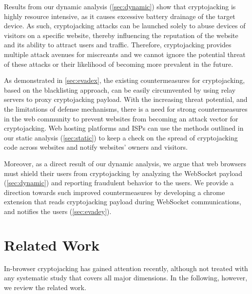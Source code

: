 \documentclass[acmlarge]{acmart}
\newcommand{\cc}{{cryptocurrency}\xspace}
\newcommand{\cj}{cryptojacking\xspace}
\begin{document}
Results from our dynamic analysis (\textsection\ref{sec:dynamic}) show that \cj is highly resource intensive, as it causes excessive battery drainage of the target device. As such, \cj attacks can be launched solely to abuse devices of visitors on a specific website, thereby influencing the reputation of the website and its ability to attract users and traffic. Therefore, \cj provides multiple attack avenues for miscreants and we cannot ignore the potential threat of these attacks or their likelihood of becoming more prevalent in the future. 

As demonstrated in \textsection\ref{sec:evadex}, the existing countermeasures for \cj, based on the blacklisting approach, can be easily circumvented by using relay servers to proxy \cj payload. With the increasing threat potential, and the limitations of defense mechanisms, there is a need for strong countermeasures in the web community to prevent websites from becoming an attack vector for \cj. Web hosting platforms and ISPs can use the methods outlined in our static analysis (\textsection\ref{sec:static}) to keep a check on the spread of \cj code across websites and notify websites' owners and visitors. 

Moreover, as a direct result of our dynamic analysis, we argue that web browsers must shield their users from \cj by analyzing the WebSocket payload (\textsection\ref{sec:dynamic}) and reporting fraudulent behavior to the users. We provide a direction towards such improved countermeasures by developing a chrome extension that reads \cj payload during WebSocket communications, and notifies the users (\textsection\ref{sec:evadey}).


\section{Related Work} \label{sec:rw}
In-browser \cj has gained attention recently, although not treated with any systematic study that covers all major dimensions. In the following, however, we review the related work. %
\end{document}
